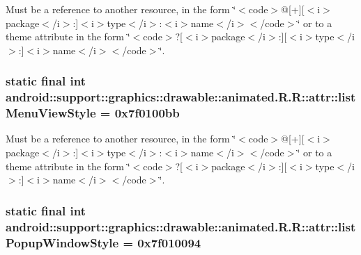 Must be a reference to another resource, in the form \char`\"{}$<$code$>$@\mbox{[}+\mbox{]}\mbox{[}$<$i$>$package$<$/i$>$:\mbox{]}$<$i$>$type$<$/i$>$:$<$i$>$name$<$/i$>$$<$/code$>$\char`\"{} or to a theme attribute in the form \char`\"{}$<$code$>$?\mbox{[}$<$i$>$package$<$/i$>$:\mbox{]}\mbox{[}$<$i$>$type$<$/i$>$:\mbox{]}$<$i$>$name$<$/i$>$$<$/code$>$\char`\"{}. \hypertarget{classandroid_1_1support_1_1graphics_1_1drawable_1_1animated_1_1_r_1_1attr_a5e5fd3a2703f6cc4779b7eee4fc272b}{
\subsubsection[{listMenuViewStyle}]{\setlength{\rightskip}{0pt plus 5cm}static final int android::support::graphics::drawable::animated.R.R::attr::listMenuViewStyle = 0x7f0100bb}}
\label{classandroid_1_1support_1_1graphics_1_1drawable_1_1animated_1_1_r_1_1attr_a5e5fd3a2703f6cc4779b7eee4fc272b}


Must be a reference to another resource, in the form \char`\"{}$<$code$>$@\mbox{[}+\mbox{]}\mbox{[}$<$i$>$package$<$/i$>$:\mbox{]}$<$i$>$type$<$/i$>$:$<$i$>$name$<$/i$>$$<$/code$>$\char`\"{} or to a theme attribute in the form \char`\"{}$<$code$>$?\mbox{[}$<$i$>$package$<$/i$>$:\mbox{]}\mbox{[}$<$i$>$type$<$/i$>$:\mbox{]}$<$i$>$name$<$/i$>$$<$/code$>$\char`\"{}. \hypertarget{classandroid_1_1support_1_1graphics_1_1drawable_1_1animated_1_1_r_1_1attr_6b8d717596e28632dd77aa2eae804b9a}{
\subsubsection[{listPopupWindowStyle}]{\setlength{\rightskip}{0pt plus 5cm}static final int android::support::graphics::drawable::animated.R.R::attr::listPopupWindowStyle = 0x7f010094}}
\label{classandroid_1_1support_1_1graphics_1_1drawable_1_1animated_1_1_r_1_1attr_6b8d717596e28632dd77aa2eae804b9a}


